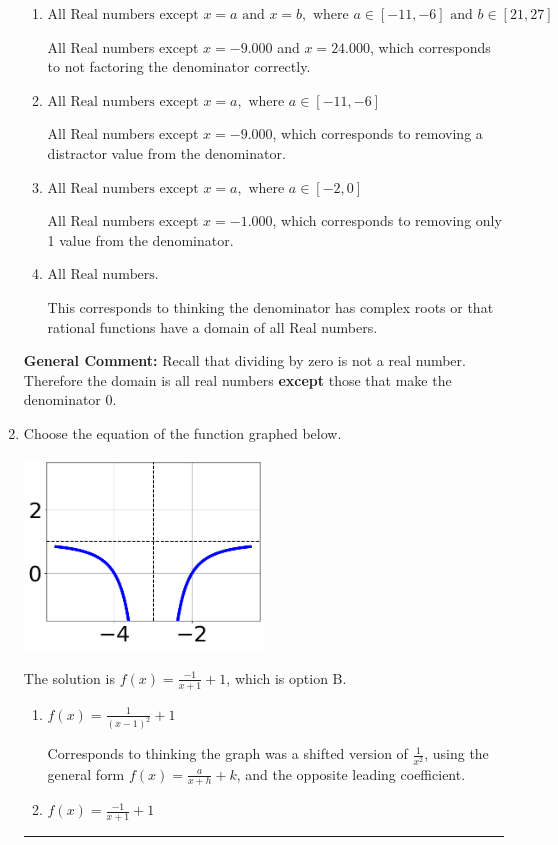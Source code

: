 \documentclass{extbook}[14pt]
\newcommand{\litem}[1]{\item #1

\rule{\textwidth}{0.4pt}}
\begin{document}
\begin{enumerate}
{\begin{enumerate}[label=\Alph*.]
All Real numbers except $x = -1.000$ and $x = 1.500$, which is the correct option.
\item \( \text{All Real numbers except } x = a \text{ and } x = b, \text{ where } a \in [-11, -6] \text{ and } b \in [21, 27] \)

All Real numbers except $x = -9.000$ and $x = 24.000$, which corresponds to not factoring the denominator correctly.
\item \( \text{All Real numbers except } x = a, \text{ where } a \in [-11, -6] \)

All Real numbers except $x = -9.000$, which corresponds to removing a distractor value from the denominator.
\item \( \text{All Real numbers except } x = a, \text{ where } a \in [-2, 0] \)

All Real numbers except $x = -1.000$, which corresponds to removing only 1 value from the denominator.
\item \( \text{All Real numbers.} \)

This corresponds to thinking the denominator has complex roots or that rational functions have a domain of all Real numbers.
\end{enumerate}

\textbf{General Comment:} Recall that dividing by zero is not a real number. Therefore the domain is all real numbers \textbf{except} those that make the denominator 0.
}
\litem{
Choose the equation of the function graphed below.

\begin{center}
    \includegraphics[width=0.5\textwidth]{../Figures/rationalGraphToEquationCopyC.png}
\end{center}


The solution is \( f(x) = \frac{-1}{x + 1} + 1 \), which is option B.\begin{enumerate}[label=\Alph*.]
\item \( f(x) = \frac{1}{(x - 1)^2} + 1 \)

Corresponds to thinking the graph was a shifted version of $\frac{1}{x^2}$, using the general form $f(x) = \frac{a}{x+h}+k$, and the opposite leading coefficient.
\item \( f(x) = \frac{-1}{x + 1} + 1 \)


\end{enumerate}}
\end{enumerate}
\end{document}
